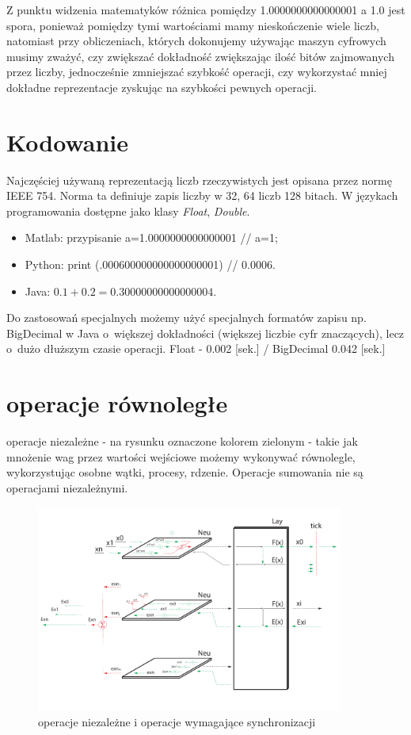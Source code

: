 Z punktu widzenia matematyków różnica pomiędzy 1.0000000000000001 a 1.0 jest spora, ponieważ pomiędzy tymi wartościami mamy nieskończenie wiele liczb, natomiast przy obliczeniach, których dokonujemy używając maszyn cyfrowych musimy zważyć, czy zwiększać dokładność zwiększając ilość bitów zajmowanych przez liczby, jednocześnie zmniejszać szybkość operacji, czy wykorzystać mniej dokładne reprezentacje zyskując na szybkości pewnych operacji. 

\section{Kodowanie}
Najczęściej używaną reprezentacją liczb rzeczywistych jest opisana przez normę IEEE 754. Norma ta definiuje zapis liczby w 32, 64 liczb 128 bitach. W językach programowania dostępne jako klasy \textit{Float}, \textit{Double}. 



\begin{itemize}
    \item Matlab: przypisanie a=1.0000000000000001 //  a=1;
    \item Python: print (.000600000000000000001) // 0.0006. 
    \item Java: \(0.1 + 0.2 = 0.30000000000000004.\)
\end{itemize}

Do zastosowań specjalnych możemy użyć specjalnych formatów zapisu np. BigDecimal w Java o~większej dokładności (większej liczbie cyfr znaczących), lecz o~dużo dłuższym czasie operacji.  
\newline
Float - 0.002 [sek.] / BigDecimal 0.042 [sek.]

\break

\section{operacje równoległe}
operacje niezależne - na rysunku oznaczone kolorem zielonym - takie jak mnożenie wag przez wartości wejściowe możemy wykonywać równolegle, wykorzystując osobne wątki, procesy, rdzenie. Operacje sumowania nie są operacjami niezależnymi. 

\begin{figure}[h]
	\centering \includegraphics[width=0.9\textwidth]{gfx/3drev.pdf} 
	\caption{ operacje niezależne i operacje wymagające synchronizacji}
	\label{rys:operacjesynch}
\end{figure}


